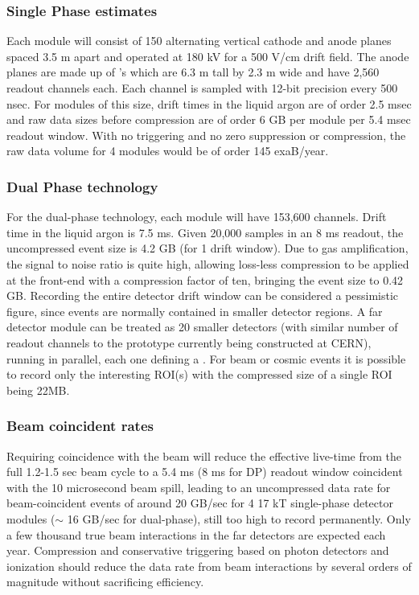 \subsubsection{Single Phase estimates}
 Each    module will consist of 
150 alternating vertical cathode and anode planes  spaced 3.5 m apart and operated at 180 kV for a 500 V/cm drift field.  The anode planes are made up of 's which are 6.3 m tall by 2.3 m wide and have 2,560 readout channels each. Each channel is sampled with 12-bit precision every 500 nsec. %
For modules of this size, drift times in the liquid argon are of order 2.5 msec and raw data sizes before compression are of order 6 GB per module per 5.4 msec readout window.  With no triggering and no zero suppression or compression, the raw data volume for 4 modules would be of order 145 exaB/year. 




\subsubsection{Dual Phase technology}

For the dual-phase technology, each  module will have 153,600 channels. Drift time in the liquid argon is 7.5 ms. Given 20,000 samples in an 8 ms readout, the uncompressed event size is 4.2 GB (for 1 drift window).  Due to gas amplification, the signal to noise ratio is quite high, allowing loss-less compression to be applied at the front-end  with a compression factor of ten, bringing the event size to 0.42 GB. Recording the entire detector drift window can be considered a pessimistic figure, since events are normally contained in smaller detector regions. A  far detector module can be treated as 20 smaller  detectors (with similar number  of readout channels to the prototype currently being constructed at CERN), running in parallel, each one defining a . For beam or cosmic events it is possible to record only the interesting ROI(s) with the compressed size of a single ROI being 22MB.

\subsubsection{Beam coincident rates}

Requiring  coincidence with the  beam will reduce the effective live-time from the full 1.2-1.5 sec beam cycle to a 5.4 ms (8 ms for DP)  readout window coincident with the 10 microsecond beam spill, leading to an uncompressed data rate for beam-coincident events of around 20 GB/sec for 4 17 kT single-phase detector modules ($\sim$ 16 GB/sec for dual-phase), still too high to record permanently.
Only a few thousand true beam interactions in the far detectors are expected each year.  Compression and conservative triggering based on photon detectors and ionization should reduce the data rate from beam interactions by several orders of magnitude without sacrificing efficiency.

